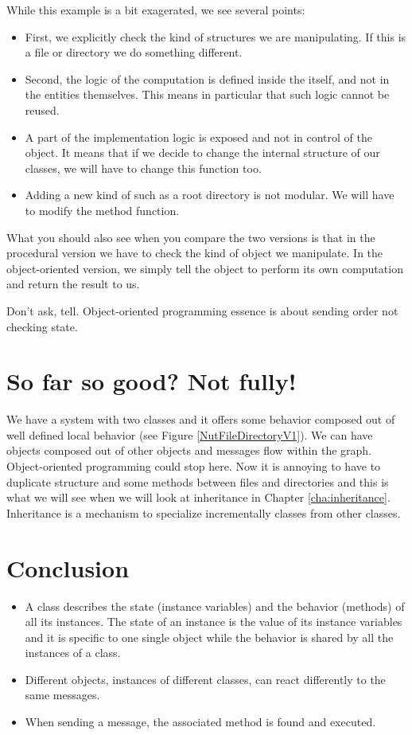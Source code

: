 \documentclass[10pt,twoside,english]{_support/latex/sbabook/sbabook}
\begin{document}
While this example is a bit exagerated, we see several points:

\begin{itemize}
\item First, we explicitly check the kind of structures we are manipulating. If this is a file or directory we do something different.
\item Second, the logic of the computation is defined inside the  itself, and not in the entities themselves.   This means in particular that such logic cannot be reused.
\item A part of the implementation logic is exposed and not in control of the object. It means that if we decide to change the internal structure of our classes, we will have to change this function too.
\item Adding a new kind of such as a root directory is not modular. We will have to modify the method  function.
\end{itemize}

What you should also see when you compare the two versions is that in the procedural version we have to check the kind of object we manipulate. 
In the object-oriented version, we simply tell the object to perform its own computation and return the result to us. 

\begin{important}
Don't ask, tell. Object-oriented programming essence is about sending order not checking state.
\end{important}
\section{So far so good? Not fully!}
We have a system with two classes and it offers some behavior composed out of well defined local behavior (see Figure \ref{NutFileDirectoryV1}). We can have objects composed out of other objects and messages flow within the graph. Object-oriented programming could stop here. Now it is annoying to have to duplicate structure and some methods between files and directories and this is what we will see when we will look at inheritance in Chapter \ref{cha:inheritance}.
Inheritance is a mechanism to specialize incrementally classes from other classes. 
\section{Conclusion}
\begin{itemize}
\item A class describes the state (instance variables) and the behavior (methods) of all its instances. The state of an instance is the value of its instance variables and it is specific to one single object while the behavior is shared by all the instances of a class.
\item Different objects, instances of different classes, can react differently to the same messages.
\item When sending a message, the associated method is found and executed.
\end{itemize}
\end{document}
